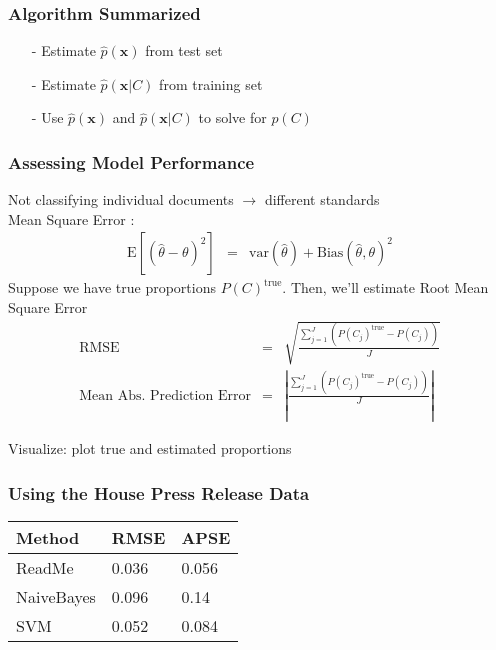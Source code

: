 \documentclass{beamer}
\begin{document}
\begin{frame}
\frametitle{Algorithm Summarized} 

\begin{itemize}
\item[-] Estimate $\hat{p}(\boldsymbol{x})$ from test set
\item[-] Estimate $\hat{p}(\boldsymbol{x}|C)$ from training set 
\item[-] Use $\hat{p}(\boldsymbol{x})$ and $\hat{p}(\boldsymbol{x}|C)$ to solve for $p(C)$
\end{itemize}


\end{frame}


\begin{frame}
\frametitle{Assessing Model Performance} 

Not classifying individual documents $\rightarrow$ different standards\\
\alert{Mean Square Error} : 
\begin{eqnarray}
\text{E}[(\hat{\theta} - \theta) ^2] & = & \text{var} (\hat{\theta} ) + \text{Bias}(\hat{\theta},  \theta)^2 \nonumber 
\end{eqnarray}
Suppose we have true proportions $P(C)^{\text{true}}$.  Then, we'll estimate \alert{Root Mean Square Error } 
\begin{eqnarray}
\text{RMSE} & = & \sqrt{ \frac{\sum_{j=1}^{J} (P(C_j)^{\text{true}} - P(C_j) ) } {J} } \nonumber \\
\text{Mean Abs. Prediction Error} & = & | \frac{\sum_{j=1}^{J} (P(C_j)^{\text{true}} - P(C_j) ) } {J} | \nonumber
\end{eqnarray}

\alert{Visualize}: plot true and estimated proportions


\end{frame}


\begin{frame}
\begin{center}
\end{center}

\end{frame}

\begin{frame}
\frametitle{Using the House Press Release Data}

\begin{tabular}{lll} 
\hline\hline
Method & RMSE & APSE  \\
\hline
ReadMe &  0.036  & 0.056 \\
NaiveBayes & 0.096 & 0.14 \\
SVM & 0.052 & 0.084 \\
\hline
\end{tabular}




\end{frame}
\end{document}

